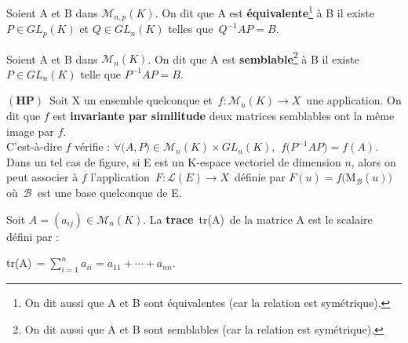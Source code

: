 \vspace{1.3cm}

Soient A et B dans \(\mathcal{M}_{n,p}(K)\). On dit que A est \textbf{équivalente}\footnote{On dit aussi que A et B sont équivalentes (car la relation est symétrique).} à B \ssi il existe \(P\in GL_p(K)\) et \(Q\in GL_n(K)\) telles que \(\,Q^{-1}AP=B\).

\vspace{1.3cm}

Soient A et B dans \(\mathcal{M}_n(K)\). On dit que A est \textbf{semblable}\footnote{On dit aussi que A et B sont semblables (car la relation est symétrique).} à B \ssi il existe \(P\in GL_n(K)\) telle que \(P^{-1}AP=B.\)

\vspace{1.5cm}

\(\left(\mathbf{HP}\right)\,\) Soit X un ensemble quelconque et \(\,f:\mathcal{M}_n(K)\to X\,\) une application. On dit que $f$ est \textbf{invariante par similitude} \ssi deux matrices semblables ont la même image par $f$.\vspace{0.1cm}\\ 
C'est-à-dire \ssi $f$ vérifie : \(\forall\bigl(A,P\bigr)\in\mathcal{M}_n(K)\times GL_n(K),\ \, f\bigl(P^{-1}AP\bigr)=f(A).\)\vspace{0.1cm}\\
Dans un tel cas de figure, si E est un K-espace vectoriel de dimension $n$, alors on peut associer à $f$ l'application \(\,F:\mathscr{L}(E)\to X\,\) définie par \(F(u)=f\bigl(\text{M}_\mathcal{B}(u)\bigr)\) où \(\,\mathcal{B}\,\) est une base quelconque de E.

\vspace{1.7cm}

Soit \(A=(a_{ij})\in\mathcal{M}_n(K)\). La \textbf{trace}\, tr(A)\, de la matrice A est le scalaire défini par :

\hspace{5cm}tr(A)\(\displaystyle\,=\sum_{i=1}^{n}a_{ii}=a_{11}+\cdots+a_{nn}.\)

\vspace{1.4cm}

